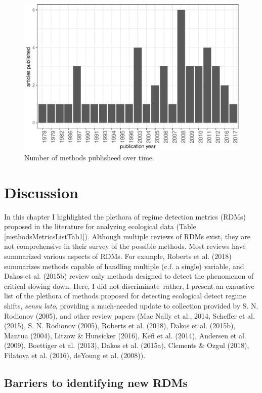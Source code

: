 \documentclass[12pt,twoside,openany]{reedthesis}
\begin{document}
\begin{figure}
\centering
\includegraphics{_myDissertation_files/figure-latex/jrnlYearFig-1.pdf}
\caption{\label{fig:jrnlYearFig}Number of methods publisheed over time.}
\end{figure}
\section{Discussion}\label{discussion}

In this chapter I highlighted the plethora of regime detection metrics
(RDMs) proposed in the literature for analyzing ecological data (Table
\ref{methodsMetricsListTab1}). Although multiple reviews of RDMs exist,
they are not comprehensive in their survey of the possible methods. Most
reviews have summarized various aspects of RDMs. For example, Roberts et
al. (2018) summarizes methods capable of handling multiple (c.f. a
single) variable, and Dakos et al. (2015b) review only methods designed
to detect the phenomenon of critical slowing down. Here, I did not
discriminate--rather, I present an exaustive list of the plethora of
methods proposed for detecting ecological detect regime shifts,
\emph{sensu lato}, providing a much-needed update to collection provided
by S. N. Rodionov (2005), and other review papers (Mac Nally et al.,
2014, Scheffer et al. (2015), S. N. Rodionov (2005), Roberts et al.
(2018), Dakos et al. (2015b), Mantua (2004), Litzow \& Hunsicker (2016),
Kefi et al. (2014), Andersen et al. (2009), Boettiger et al. (2013),
Dakos et al. (2015a), Clements \& Ozgul (2018), Filatova et al. (2016),
deYoung et al. (2008)).

\subsection{Barriers to identifying new
RDMs}\label{barriers-to-identifying-new-rdms}
\end{document}
